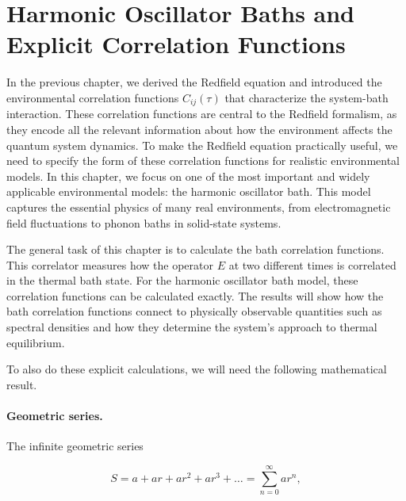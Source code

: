 \section{Harmonic Oscillator Baths and Explicit Correlation Functions}
\label{sec:harmonic_oscillator_baths}

\noindent
In the previous chapter, we derived the Redfield equation and introduced the environmental correlation functions $C_{ij}(\tau)$ that characterize the system-bath interaction. These correlation functions are central to the Redfield formalism, as they encode all the relevant information about how the environment affects the quantum system dynamics.                                                                                                         
To make the Redfield equation practically useful, we need to specify the form of these correlation functions for realistic environmental models. In this chapter, we focus on one of the most important and widely applicable environmental models: the harmonic oscillator bath. This model captures the essential physics of many real environments, from electromagnetic field fluctuations to phonon baths in solid-state systems.       


\noindent
The general task of this chapter is to calculate the bath correlation functions. This correlator measures how the operator \( E \) at two different times is correlated in the thermal bath state.
For the harmonic oscillator bath model, these correlation functions can be calculated exactly. The results will show how the bath correlation functions connect to physically observable quantities such as spectral densities and how they determine the system's approach to thermal equilibrium.

\noindent
To also do these explicit calculations, we will need the following mathematical result.


\paragraph{Geometric series.}
The infinite geometric series

\begin{equation} \label{eq:ho_infinite_geometric_series}
	S = a + ar + ar^2 + ar^3 + \dots = \sum_{n=0}^{\infty} ar^n,
\end{equation}

